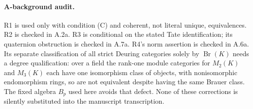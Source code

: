 \paragraph{A-background audit.}
R1 is used only with condition (C) and coherent, not literal unique,
equivalences. R2 is checked in A.2a. R3 is conditional on the stated
Tate identification; its quaternion obstruction is checked in A.7a.
R4's norm assertion is checked in A.6a. Its separate classification
of all strict Deuring categories solely by $\operatorname{Br}(K)$
needs a degree qualification: over a field the rank-one module
categories for $M_2(K)$ and $M_3(K)$ each have one isomorphism class
of objects, with nonisomorphic endomorphism rings, so are not equivalent
despite having the same Brauer class. The fixed algebra $B_p$ used here
avoids that defect. None of these corrections is silently substituted
into the manuscript transcription.
